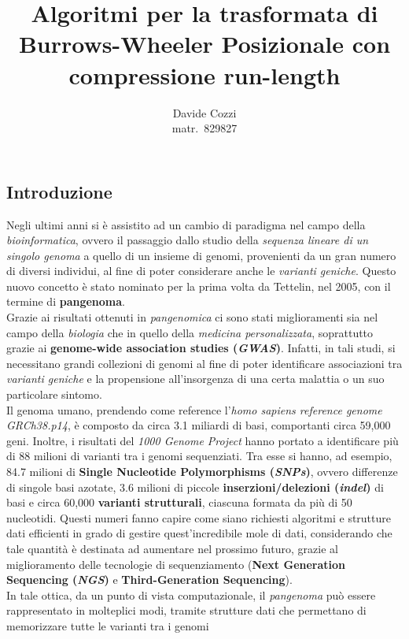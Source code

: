 \documentclass[a4paper,11pt, oneside,italian]{article}
\title{Algoritmi per la trasformata di Burrows-Wheeler
  Posizionale con compressione run-length}
\author{Davide Cozzi\\\smaller matr.~829827}
\date{}
\begin{document}
\maketitle
{}
\noindent
\subsection*{Introduzione}
Negli ultimi anni si è assistito ad un cambio di paradigma nel campo della
\textit{bioinformatica}, ovvero il passaggio dallo studio della \textit{sequenza
  lineare di un singolo genoma} a quello di un insieme di
genomi, provenienti da un gran numero di diversi individui, al fine di poter
considerare anche le \textit{varianti geniche}. Questo
nuovo concetto è stato 
nominato per la prima 
volta da Tettelin, nel 2005, con il termine di \textbf{pangenoma}.\\
Grazie ai risultati ottenuti in \textit{pangenomica} ci sono stati
miglioramenti sia nel campo della \textit{biologia} che in quello
della \textit{medicina personalizzata}, soprattutto grazie ai
\textbf{genome-wide association studies (\textit{GWAS})}. Infatti, in tali
studi, si necessitano grandi collezioni di genomi al fine di poter
identificare associazioni tra \textit{varianti geniche} e la propensione
all'insorgenza di una
certa malattia o un suo particolare sintomo.\\
Il genoma umano,
prendendo come reference l'\textit{homo sapiens reference
genome GRCh38.p14}, è composto da circa
3.1 miliardi di basi, comportanti circa 59,000 geni. Inoltre, i risultati del
\textit{1000 Genome Project} hanno portato a identificare più di 88 milioni di
varianti tra i genomi sequenziati. Tra esse si hanno, ad esempio, 84.7 milioni
di \textbf{Single Nucleotide Polymorphisms (\textit{SNPs})}, ovvero differenze
di singole basi azotate, 3.6 milioni di piccole \textbf{inserzioni/delezioni
  (\textit{indel})} di basi e circa 60,000 \textbf{varianti strutturali},
ciascuna formata da più di 50 nucleotidi. Questi numeri fanno capire come siano
richiesti algoritmi e strutture 
dati efficienti in grado di gestire quest'incredibile mole di dati, considerando
che tale quantità è destinata ad aumentare nel prossimo futuro, grazie al
miglioramento delle tecnologie di sequenziamento (\textbf{Next Generation
  Sequencing (\textit{NGS})} e \textbf{Third-Generation Sequencing}).\\ 
In tale ottica, da un punto di vista computazionale, il
\textit{pangenoma} può essere rappresentato in molteplici modi, tramite
strutture dati che permettano di memorizzare tutte le varianti tra i genomi
\end{document}

